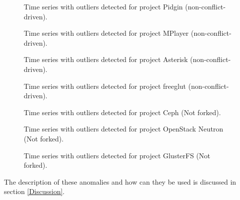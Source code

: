\documentclass[12pt,letterpaper]{gthesis2}  %
\begin{document}
\begin{figure}
\centering
{}
\caption{Time series with outliers detected for project Pidgin (non-conflict-driven).}
\label{figureOutliers_5}
\end{figure}

\begin{figure}
\centering
{}
\caption{Time series with outliers detected for project MPlayer (non-conflict-driven).}
\label{figureOutliers_6}
\end{figure}

\begin{figure}
\centering
{}
\caption{Time series with outliers detected for project Asterisk (non-conflict-driven).}
\label{figureOutliers_7}
\end{figure}

\clearpage

\begin{figure}
\centering
{}
\caption{Time series with outliers detected for project freeglut (non-conflict-driven).}
\label{figureOutliers_9}
\end{figure}


\begin{figure}
\centering
{}
\caption{Time series with outliers detected for project Ceph (Not forked).}
\label{figureOutliers_10}
\end{figure}

\begin{figure}
\centering
{}
\caption{Time series with outliers detected for project OpenStack Neutron (Not forked).}
\label{figureOutliers_11}
\end{figure}

\begin{figure}
\centering
{}
\caption{Time series with outliers detected for project GlusterFS (Not forked).}
\label{figureOutliers_12}
\end{figure}

\pagebreak

The description of these anomalies and how can they be used is discussed in section \ref{Discussion}.
\end{document}
